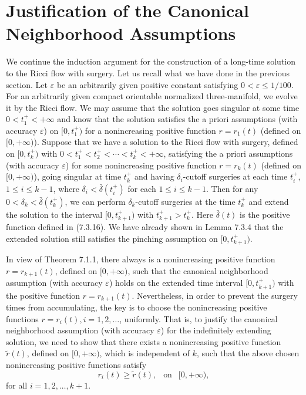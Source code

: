 \section{Justification of the Canonical Neighborhood Assumptions}

We continue the induction argument for the construction of a
long-time solution to the Ricci flow with surgery. Let us recall
what we have done in the previous section. Let $\varepsilon$ be an
arbitrarily given positive constant satisfying $0<\varepsilon \leq
1/100$. For an arbitrarily given compact orientable normalized
three-manifold, we evolve it by the Ricci flow. We may assume that
the solution goes singular at some time $0<t^+_1<+\infty$ and know
that the solution satisfies the a priori assumptions (with
accuracy $\varepsilon$) on $[0,t^+_1)$ for a nonincreasing
positive function $r=r_1(t)$ (defined on $[0,+\infty)$). Suppose
that we have a solution to the Ricci flow with surgery, defined on
$[0,t^+_k)$ with $0<t^+_1<t^+_2<\cdots<t^+_k<+\infty$, satisfying
the a priori assumptions (with accuracy $\varepsilon$) for some
nonincreasing positive function $r=r_k(t)$ (defined on
$[0,+\infty)$), going singular at time $t^+_k$ and having
$\delta_i$-cutoff surgeries at each time $t^+_i$, $1\leq i\leq
k-1$, where $\delta_i < \bar{\delta}(t^+_i)$ for each $1\leq i\leq
k-1$. Then for any $0<\delta_k < \bar{\delta}(t^+_k)$, we can
perform $\delta_k$-cutoff surgeries at the time $t^+_k$ and extend
the solution to the interval $[0,t^+_{k+1})$ with
$t^+_{k+1}>t^+_k$. Here $\bar{\delta}(t)$ is the positive function
defined in (7.3.16). We have already shown in Lemma 7.3.4 that the
extended solution still satisfies the pinching assumption on
$[0,t^+_{k+1})$.

In view of Theorem 7.1.1, there always is a nonincreasing positive
function $r=r_{k+1}(t)$, defined on $[0,+\infty)$, such that the
canonical neighborhood assumption (with accuracy $\varepsilon$)
holds on the extended time interval $[0,t^+_{k+1})$ with the
positive function $r=r_{k+1}(t)$. Nevertheless, in order to
prevent the surgery times from accumulating, the key is to choose
the nonincreasing positive functions $r=r_i(t), i= 1, 2, \ldots$,
uniformly. That is, to justify the canonical neighborhood
assumption (with accuracy $\varepsilon$) for the indefinitely
extending solution, we need to show that there exists a
nonincreasing positive function $\widetilde{r}(t)$, defined on
$[0,+\infty)$, which is independent of $k$, such that the above
chosen nonincreasing positive functions satisfy
$$r_i(t) \geq \widetilde{r}(t), \ \
\mbox{ on } \ \ [0,+\infty),$$ for all $i = 1, 2, \ldots, k+1$.

